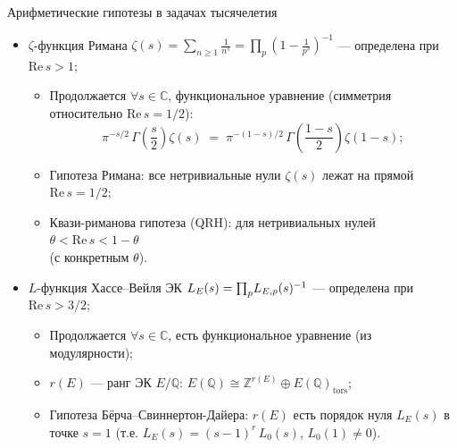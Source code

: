 \documentclass[serif, aspectratio=169]{beamer}
\begin{document}
\begin{frame}{Арифметические гипотезы в задачах тысячелетия}
    \begin{itemize}
        \item $\zeta$-функция Римана $\zeta(s)=\sum_{n\geqslant 1} \frac{1}{n^s} = \prod_p (1-\frac{1}{p^s})^{-1}$ --- определена при $\mathrm{Re}\, s > 1$;
        \begin{itemize}
            \item Продолжается $\forall s\in\mathbb{C}$, функциональное уравнение (симметрия относительно $\mathrm{Re}\, s = 1/2$): 
            \[\pi^{-s/2}\,\Gamma\!\left(\frac{s}{2}\right)\zeta(s) \;=\; \pi^{-(1-s)/2}\,\Gamma\!\left(\frac{1-s}{2}\right)\zeta(1-s);\]
            \item Гипотеза Римана: все нетривиальные нули $\zeta(s)$ лежат на прямой $\mathrm{Re}\, s = 1/2$;
            \item Квази-риманова гипотеза (QRH): для нетривиальных нулей $\theta < \mathrm{Re}\, s < 1-\theta$\\ (с конкретным $\theta$).
        \end{itemize}
        \item $L$-функция Хассе--Вейля ЭК $L_E(s) = \smash{\prod_p} L_{E,p}(s)^{-1}$ --- определена при $\mathrm{Re}\, s > 3/2$;
        \begin{itemize}
            \item Продолжается $\forall s\in\mathbb{C}$, есть функциональное уравнение (из модулярности);
            \item $r(E)$ --- ранг ЭК $E/\mathbb{Q}$: $E(\mathbb{Q}) \cong \mathbb{Z}^{r(E)} \oplus E(\mathbb{Q})_{\mathrm{tors}}$;
            \item Гипотеза Бёрча--Свиннертон-Дайера: $r(E)$ есть порядок нуля $L_E(s)$ в точке $s=1$ (т.е. $L_E(s)=(s-1)^r\, L_0(s)$, $L_0(1)\ne0$).
        \end{itemize}
        
    \end{itemize}

    \note{
        \begin{itemize}
            \item ---
        \end{itemize}
    }
\end{frame}
\end{document}
